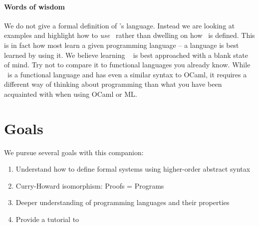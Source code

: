 \paragraph{Words of wisdom}
We do not give a formal definition of \beluga's language.  Instead  we are looking at examples and highlight how to \emph{use} \beluga~rather than dwelling on how \beluga~is defined. This is in fact how most learn a given programming language -- a language is best learned by using it. We believe learning \beluga~ is best approached with a blank state of mind. Try not to compare it to functional languages you already know. While \beluga~is a functional language and has even a similar syntax to OCaml,  it requires a different way of thinking about programming than what you have been acquainted with when using OCaml or ML.



\section{Goals}
We pursue several goals with this companion:

\begin{enumerate}
\item Understand how to define formal systems using higher-order abstract syntax
\item Curry-Howard isomorphism: Proofs = Programs
\item Deeper understanding of programming languages and their properties
\item Provide a tutorial to \beluga
\end{enumerate}




